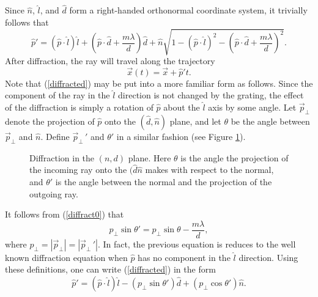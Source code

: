 \documentclass{article}
\newcommand{\eq}[1]{(\ref{#1})}
\newcommand{\p}{\hat{p}}
\newcommand{\x}{\vec{x}}
\newcommand{\pperp}{\vec{p}_{\perp}}
\newcommand{\pperpp}{\pperp\,\!\!\!\!'}
\begin{document}
 Since $\hat{n}$, $\hat{l}$, and $\hat{d}$ form a right-handed orthonormal
 coordinate system, it trivially follows that
\begin{equation} 
  \p' = (\p\cdot\hat{l})\hat{l}
        + (\p\cdot\hat{d} + \frac{m\lambda}{d})\hat{d}
        + \hat{n} \sqrt{1  
                       - (\p\cdot\hat{l})^2 
                       - (\p\cdot\hat{d} + \frac{m\lambda}{d})^2}.
                   \label{diffracted}
\end{equation}
 After diffraction, the ray will travel along the trajectory
\begin{equation} 
   \x(t) = \x + \p't.
\end{equation}
 Note that \eq{diffracted} may be put into a more familiar form as
 follows.  Since the component of the ray in the $\hat{l}$ direction is not
 changed by the grating, the effect of the diffraction is simply a
 rotation of $\p$ about the $\hat{l}$ axis by some angle.  Let
 $\pperp$ denote the projection of $\p$ onto the
 $(\hat{d},\hat{n})$ plane, and let $\theta$ be the angle between
 $\pperp$ and $\hat{n}$.  Define $\pperpp$ and $\theta'$ in a similar
 fashion (see Figure \ref{fig:simplediffraction}).
\begin{figure}
\begin{center}
\caption{Diffraction in the $(n,d)$ plane.  Here $\theta$ is the
angle the projection of the incoming ray onto the $(\hat{d}\hat{n}$
makes with respect to the normal, and $\theta'$ is the angle between
the normal and the projection of the outgoing ray.}
\label{fig:simplediffraction}
\end{center}
\end{figure}
 It follows from 
 \eq{diffract0} that
\begin{equation}
   p_{\perp} \sin \theta' = p_{\perp} \sin \theta - \frac{m\lambda}{d},
\end{equation}
 where $p_{\perp} = |\pperp| = |\pperpp|$.  In fact, the previous
 equation is reduces to the well known diffraction equation when $\p$
 has no component in the $\hat{l}$ direction.  Using these
 definitions, one can write \eq{diffracted} in the form
\begin{equation} 
  \p' = (\p\cdot\hat{l})\hat{l}
        - (p_{\perp} \sin{\theta'}) \hat{d} 
        + (p_{\perp} \cos{\theta'}) \hat{n}.
\end{equation} 
\end{document}
